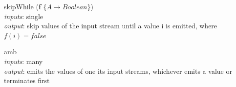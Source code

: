 \documentclass{dithesis}
\begin{document}
\begin{description}
\begin{minipage}[c]{\lll}
\item[skipWhile] (\textbf{f} $\{ A \to Boolean \}$) \\
	\textit{inputs}: single \\
	\textit{output}: skip values of the input stream until a value i is emitted, where $f(i) = false$
\end{minipage}
\hfill
\begin{minipage}[c]{\rrr}

\end{minipage}
\newline \newline \newline
\begin{minipage}[c]{\lll}
\item[amb] ~\\
	\textit{inputs}: many \\
	\textit{output}: emits the values of one its input streams, whichever emits a value or terminates first
\end{minipage}
\hfill
\begin{minipage}[c]{\rrr}

\end{minipage}
\newline \newline \newline
\end{description}
\end{document}
